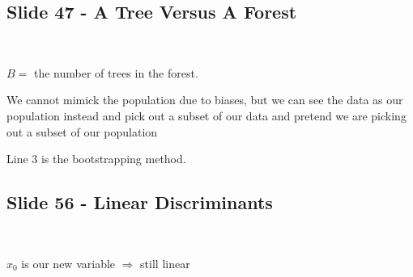 \subsection{Slide 47 - A Tree Versus A Forest}\hfill\\\par
\noindent $B = $ the number of trees in the forest.
\par\bigskip
\noindent We cannot mimick the population due to biases, but we can see the data as our population instead and pick out a subset of our data and pretend we are picking out a subset of our population 
\par\bigskip
\noindent Line 3 is the bootstrapping method. 
\par\bigskip
\subsection{Slide 56 - Linear Discriminants}\hfill\\\par
\noindent $x_0$ is our new variable $\Rightarrow$ still linear
